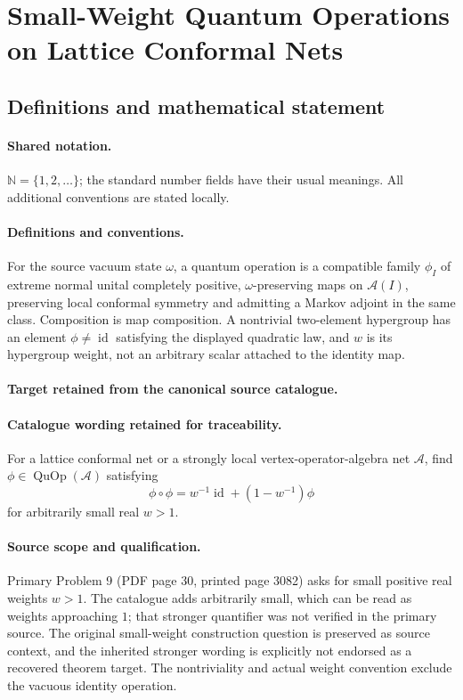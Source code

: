 \documentclass[11pt]{article}
\begin{document}
\section{Small-Weight Quantum Operations on Lattice Conformal Nets}\label{statement}

\subsection{Definitions and mathematical statement}

\paragraph{Shared notation.}$\mathbb N=\{1,2,\ldots\}$; the standard number fields have their usual meanings. All additional conventions are stated locally.


\paragraph{Definitions and conventions.}
For the source vacuum state $\omega$, a quantum operation is a compatible family $\phi_I$ of extreme normal unital completely positive, $\omega$-preserving maps on $\mathcal A(I)$, preserving local conformal symmetry and admitting a Markov adjoint in the same class. Composition is map composition. A nontrivial two-element hypergroup has an element $\phi\ne\operatorname{id}$ satisfying the displayed quadratic law, and $w$ is its hypergroup weight, not an arbitrary scalar attached to the identity map.

\paragraph{Target retained from the canonical source catalogue.}
\paragraph{Catalogue wording retained for traceability.}
For a lattice conformal net or a strongly local vertex-operator-algebra net $\mathcal A$, find $\phi\in\operatorname{QuOp}(\mathcal A)$ satisfying $$\phi\circ\phi=w^{-1}\operatorname{id}+(1-w^{-1})\phi$$ for arbitrarily small real $w>1$.

\paragraph{Source scope and qualification.}
Primary Problem 9 (PDF page 30, printed page 3082) asks for small positive real weights $w>1$. The catalogue adds arbitrarily small, which can be read as weights approaching $1$; that stronger quantifier was not verified in the primary source. The original small-weight construction question is preserved as source context, and the inherited stronger wording is explicitly not endorsed as a recovered theorem target. The nontriviality and actual weight convention exclude the vacuous identity operation.
\end{document}
